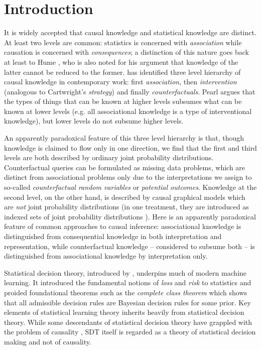 
\section{Introduction}

\vspace{-3mm}

It is widely accepted that causal knowledge and statistical knowledge are distinct. At least two levels are common: statistics is concerned with \emph{association} while causation is concerned with \emph{consequences}; a distinction of this nature goes back at least to Hume \citep{morris_david_2019}, who is also noted for his argument that knowledge of the latter cannot be reduced to the former. \citet{pearl_causality:_2009} has identified three level hierarchy of causal knowledge in contemporary work: first \emph{association}, then \emph{intervention} (analogous to Cartwright's \emph{strategy}) and finally \emph{counterfactuals}. Pearl argues that the types of things that can be known at higher levels subsumes what can be known at lower levels (e.g. all associational knowledge is a type of interventional knowledge), but lower levels do not subsume higher levels.

An apparently paradoxical feature of this three level hierarchy is that, though knowledge is claimed to flow only in one direction, we find that the first and third levels are both described by ordinary joint probability distributions. Counterfactual queries can be formulated as missing data problems, which are distinct from associational problems only due to the interpretations we assign to so-called \emph{counterfactual random variables} or \emph{potential outcomes}. Knowledge at the second level, on the other hand, is described by causal graphical models which are \emph{not} joint probability distributions (in one treatment, they are introduced as indexed sets of joint probability distributions \cite{pearl_causality:_2009}). Here is an apparently paradoxical feature of common approaches to causal inference: associational knowledge is distinguished from consequential knowledge in both interpretation and representation, while counterfactual knowledge -- considered to subsume both -- is distinguished from associational knowledge by interpretation only.

Statistical decision theory, introduced by \citet{wald_statistical_1950}, underpins much of modern machine learning. It introduced the fundamental notions of \emph{loss} and \emph{risk} to statistics and proided foundational theorems such as the \emph{complete class theorem} which shows that all admissible decision rules are Bayesian decision rules for some prior. Key elements of statistical learning theory inherits heavily from statistical decision theory. While some descendants of statistical decision theory have grappled with the problem of causality \citep{lewis_causal_1981}, SDT itself is regarded as a theory of statistical decision making and not of causality.


